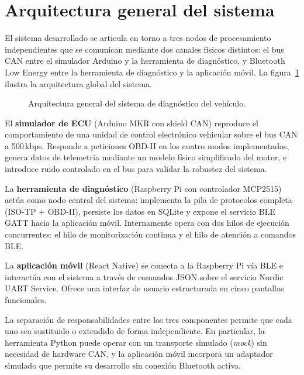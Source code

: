 \section{Arquitectura general del sistema}
\label{sec:arquitectura}

El sistema desarrollado se articula en torno a tres nodos de procesamiento independientes que se comunican mediante dos canales físicos distintos: el bus CAN entre el simulador Arduino y la herramienta de diagnóstico, y Bluetooth Low Energy entre la herramienta de diagnóstico y la aplicación móvil. La figura~\ref{fig:arch_general} ilustra la arquitectura global del sistema.

\begin{figure}[!htbp]
\centering
\caption{Arquitectura general del sistema de diagnóstico del vehículo.}
\label{fig:arch_general}
\end{figure}

El \textbf{simulador de ECU} (Arduino MKR con shield CAN) reproduce el comportamiento de una unidad de control electrónico vehicular sobre el bus CAN a 500\,kbps. Responde a peticiones OBD-II en los cuatro modos implementados, genera datos de telemetría mediante un modelo físico simplificado del motor, e introduce ruido controlado en el bus para validar la robustez del sistema.

La \textbf{herramienta de diagnóstico} (Raspberry Pi con controlador MCP2515) actúa como nodo central del sistema: implementa la pila de protocolos completa (ISO-TP + OBD-II), persiste los datos en SQLite y expone el servicio BLE GATT hacia la aplicación móvil. Internamente opera con dos hilos de ejecución concurrentes: el hilo de monitorización continua y el hilo de atención a comandos BLE.

La \textbf{aplicación móvil} (React Native) se conecta a la Raspberry Pi vía BLE e interactúa con el sistema a través de comandos JSON sobre el servicio Nordic UART Service. Ofrece una interfaz de usuario estructurada en cinco pantallas funcionales.

La separación de responsabilidades entre los tres componentes permite que cada uno sea sustituido o extendido de forma independiente. En particular, la herramienta Python puede operar con un transporte simulado (\textit{mock}) sin necesidad de hardware CAN, y la aplicación móvil incorpora un adaptador simulado que permite su desarrollo sin conexión Bluetooth activa.


